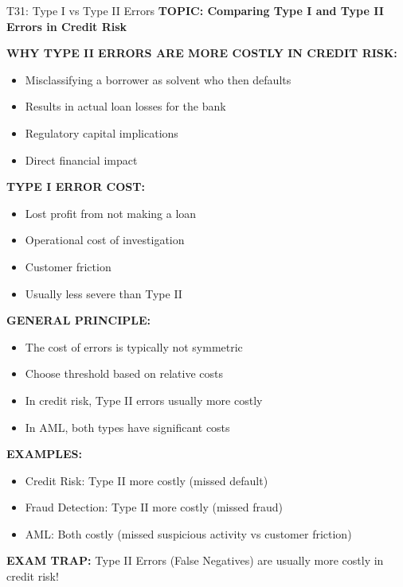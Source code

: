 \documentclass[8pt]{beamer}
\begin{document}
	\begin{frame}{T31: Type I vs Type II Errors}
		\fontsize{6.5}{7.5}\selectfont
		\textbf{TOPIC: Comparing Type I and Type II Errors in Credit Risk}
		
		\vspace{0.1cm}
		\textbf{WHY TYPE II ERRORS ARE MORE COSTLY IN CREDIT RISK:}
		\begin{itemize}
			\item Misclassifying a borrower as solvent who then defaults
			\item Results in actual loan losses for the bank
			\item Regulatory capital implications
			\item Direct financial impact
		\end{itemize}
		
		\vspace{0.1cm}
		\textbf{TYPE I ERROR COST:}
		\begin{itemize}
			\item Lost profit from not making a loan
			\item Operational cost of investigation
			\item Customer friction
			\item Usually less severe than Type II
		\end{itemize}
		
		\vspace{0.1cm}
		\textbf{GENERAL PRINCIPLE:}
		\begin{itemize}
			\item The cost of errors is typically not symmetric
			\item Choose threshold based on relative costs
			\item In credit risk, Type II errors usually more costly
			\item In AML, both types have significant costs
		\end{itemize}
		
		\vspace{0.1cm}
		\textbf{EXAMPLES:}
		\begin{itemize}
			\item \textcolor{myblue}{Credit Risk:} Type II more costly (missed default)
			\item \textcolor{myblue}{Fraud Detection:} Type II more costly (missed fraud)
			\item \textcolor{myblue}{AML:} Both costly (missed suspicious activity vs customer friction)
		\end{itemize}
		
		\textcolor{myred}{\textbf{EXAM TRAP:}} Type II Errors (False Negatives) are \textcolor{myblue}{usually more costly} in credit risk!
	\end{frame}
	
\end{document}
